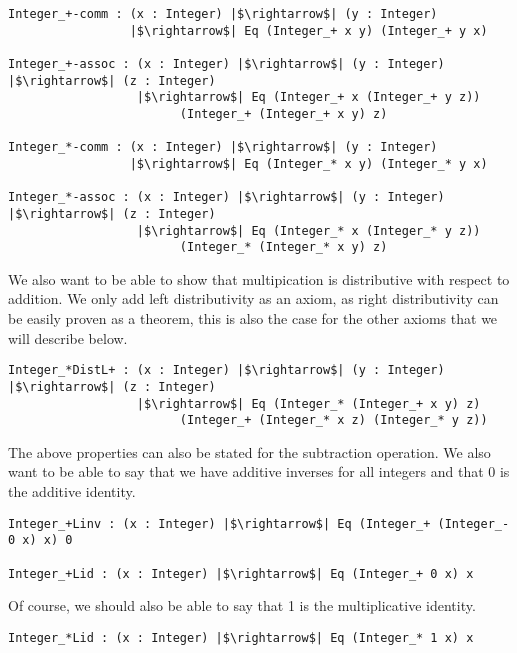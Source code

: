 \documentclass[12pt,twoside,maitrise]{dms}
\theoremstyle{definition}
\numberwithin{equation}{section}
\numberwithin{table}{chapter}
\numberwithin{figure}{chapter}
\begin{document}
\begin{verbatim}
Integer_+-comm : (x : Integer) |$\rightarrow$| (y : Integer)
                 |$\rightarrow$| Eq (Integer_+ x y) (Integer_+ y x)

Integer_+-assoc : (x : Integer) |$\rightarrow$| (y : Integer) |$\rightarrow$| (z : Integer)
                  |$\rightarrow$| Eq (Integer_+ x (Integer_+ y z))
                        (Integer_+ (Integer_+ x y) z)

Integer_*-comm : (x : Integer) |$\rightarrow$| (y : Integer)
                 |$\rightarrow$| Eq (Integer_* x y) (Integer_* y x)

Integer_*-assoc : (x : Integer) |$\rightarrow$| (y : Integer) |$\rightarrow$| (z : Integer)
                  |$\rightarrow$| Eq (Integer_* x (Integer_* y z))
                        (Integer_* (Integer_* x y) z)
\end{verbatim}

We also want to be able to show that multipication is distributive with respect to addition. We only add left distributivity as an axiom, as right distributivity can be easily proven as a theorem, this is also the case for the other axioms that we will describe below.

\begin{verbatim}
Integer_*DistL+ : (x : Integer) |$\rightarrow$| (y : Integer) |$\rightarrow$| (z : Integer)
                  |$\rightarrow$| Eq (Integer_* (Integer_+ x y) z)
                        (Integer_+ (Integer_* x z) (Integer_* y z))
\end{verbatim}

The above properties can also be stated for the subtraction operation. We also want to be able to say that we have additive inverses for all integers and that 0 is the additive identity.

\begin{verbatim}
Integer_+Linv : (x : Integer) |$\rightarrow$| Eq (Integer_+ (Integer_- 0 x) x) 0

Integer_+Lid : (x : Integer) |$\rightarrow$| Eq (Integer_+ 0 x) x
\end{verbatim}

Of course, we should also be able to say that 1 is the multiplicative identity.

\begin{verbatim}
Integer_*Lid : (x : Integer) |$\rightarrow$| Eq (Integer_* 1 x) x
\end{verbatim}
\end{document}
